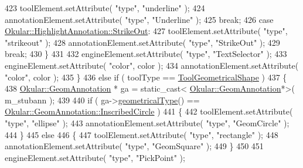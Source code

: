 \begin{DoxyCode}
423                 toolElement.setAttribute( \textcolor{stringliteral}{"type"}, \textcolor{stringliteral}{"underline"} );
424                 annotationElement.setAttribute( \textcolor{stringliteral}{"type"}, \textcolor{stringliteral}{"Underline"} );
425                 \textcolor{keywordflow}{break};
426             \textcolor{keywordflow}{case} \hyperlink{classOkular_1_1HighlightAnnotation_a63d2488735d1d6320e2e118743243999afcdb9513e4039b7239d89f351f8aff85}{Okular::HighlightAnnotation::StrikeOut}:
427                 toolElement.setAttribute( \textcolor{stringliteral}{"type"}, \textcolor{stringliteral}{"strikeout"} );
428                 annotationElement.setAttribute( \textcolor{stringliteral}{"type"}, \textcolor{stringliteral}{"StrikeOut"} );
429                 \textcolor{keywordflow}{break};
430         \}
431 
432         engineElement.setAttribute( \textcolor{stringliteral}{"type"}, \textcolor{stringliteral}{"TextSelector"} );
433         engineElement.setAttribute( \textcolor{stringliteral}{"color"}, color );
434         annotationElement.setAttribute( \textcolor{stringliteral}{"color"}, color );
435     \}
436     \textcolor{keywordflow}{else} \textcolor{keywordflow}{if} ( toolType == \hyperlink{classEditAnnotToolDialog_ae4572c0cf4fc351cf03e4d86ef595a9ca49c38af01e3175f811c5077019137e0a}{ToolGeometricalShape} )
437     \{
438         \hyperlink{classOkular_1_1GeomAnnotation}{Okular::GeomAnnotation} * ga = \textcolor{keyword}{static\_cast<}
      \hyperlink{classOkular_1_1GeomAnnotation}{Okular::GeomAnnotation}*\textcolor{keyword}{>}( m\_stubann );
439 
440         \textcolor{keywordflow}{if} ( ga->\hyperlink{classOkular_1_1GeomAnnotation_adeae1cc4b72aed7e9705b51f91f8555f}{geometricalType}() == 
      \hyperlink{classOkular_1_1GeomAnnotation_a511623ed10a8d1f18cfd5987fadee682a30a6611d755c0404efaf196327194bfc}{Okular::GeomAnnotation::InscribedCircle} )
441         \{
442             toolElement.setAttribute( \textcolor{stringliteral}{"type"}, \textcolor{stringliteral}{"ellipse"} );
443             annotationElement.setAttribute( \textcolor{stringliteral}{"type"}, \textcolor{stringliteral}{"GeomCircle"} );
444         \}
445         \textcolor{keywordflow}{else}
446         \{
447             toolElement.setAttribute( \textcolor{stringliteral}{"type"}, \textcolor{stringliteral}{"rectangle"} );
448             annotationElement.setAttribute( \textcolor{stringliteral}{"type"}, \textcolor{stringliteral}{"GeomSquare"} );
449         \}
450 
451         engineElement.setAttribute( \textcolor{stringliteral}{"type"}, \textcolor{stringliteral}{"PickPoint"} );

\end{DoxyCode}
